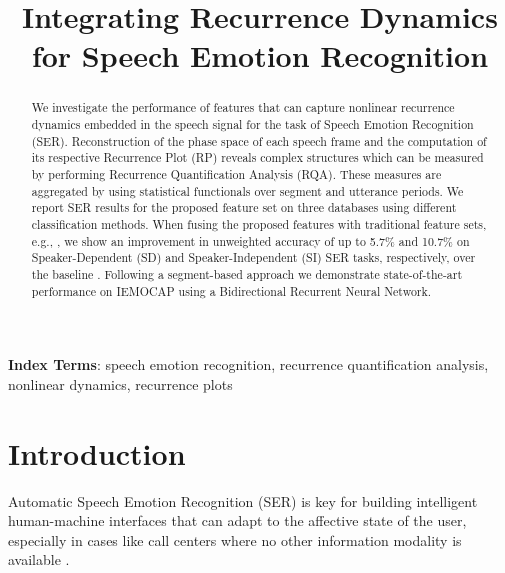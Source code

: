 \documentclass[a4paper]{article}
\title{Integrating Recurrence Dynamics for Speech Emotion Recognition}
\begin{document}
\maketitle

\begin{abstract}
We investigate the performance of features that can capture nonlinear recurrence dynamics embedded in the speech signal for the task of Speech Emotion Recognition (SER). Reconstruction of the phase space of each speech frame and the computation of its respective Recurrence Plot (RP) reveals complex structures which can be measured by performing Recurrence Quantification Analysis (RQA). These measures are aggregated by using statistical functionals over segment and utterance periods. We report SER results for the proposed feature set on three databases using different classification methods.  When fusing the proposed features with traditional feature sets, e.g., \cite{schuller2010interspeech}, we show an improvement in unweighted accuracy of up to 5.7\% and 10.7\% on Speaker-Dependent (SD) and Speaker-Independent (SI) SER tasks, respectively, over the baseline \cite{schuller2010interspeech}. Following a segment-based approach we demonstrate state-of-the-art performance on IEMOCAP using a Bidirectional Recurrent Neural Network. 


\end{abstract}
\noindent\textbf{Index Terms}: speech emotion recognition, recurrence quantification analysis, nonlinear dynamics, recurrence plots

\section{Introduction}
Automatic Speech Emotion Recognition (SER) is key for building intelligent human-machine interfaces that can adapt to the affective state of the user, especially in cases like call centers where no other information modality is available \cite{shridialogsystems}. 
\end{document}
